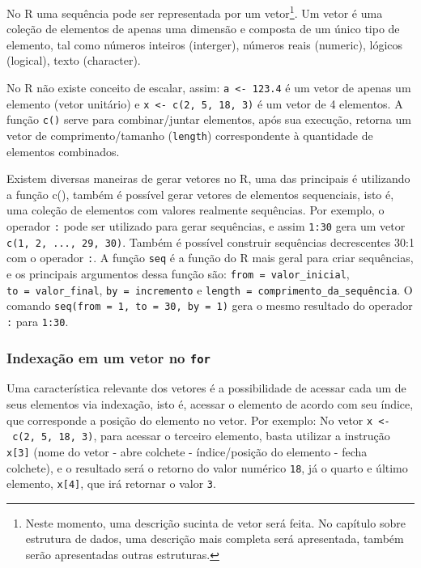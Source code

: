 \documentclass[
  11pt,
  a5paper,
  openany]{book}
\begin{document}
No R uma sequência pode ser representada por um vetor\footnote{Neste momento, uma descrição sucinta de vetor será feita. No capítulo sobre estrutura de dados, uma descrição mais completa será apresentada, também serão apresentadas outras estruturas.}. Um vetor é uma coleção de elementos de apenas uma dimensão e composta de um único tipo de elemento, tal como números inteiros (interger), números reais (numeric), lógicos (logical), texto (character).

No R não existe conceito de escalar, assim: \texttt{a\ \textless{}-\ 123.4} é um vetor de apenas um elemento (vetor unitário) e \texttt{x\ \textless{}-\ c(2,\ 5,\ 18,\ 3)} é um vetor de 4 elementos. A função \texttt{c()} serve para combinar/juntar elementos, após sua execução, retorna um vetor de comprimento/tamanho (\texttt{length}) correspondente à quantidade de elementos combinados.

Existem diversas maneiras de gerar vetores no R, uma das principais é utilizando a função c(), também é possível gerar vetores de elementos sequenciais, isto é, uma coleção de elementos com valores realmente sequências. Por exemplo, o operador \texttt{:} pode ser utilizado para gerar sequências, e assim \texttt{1:30} gera um vetor \texttt{c(1,\ 2,\ ...,\ 29,\ 30)}. Também é possível construir sequências decrescentes 30:1 com o operador \texttt{:}. A função \texttt{seq} é a função do R mais geral para criar sequências, e os principais argumentos dessa função são: \texttt{from\ =\ valor\_inicial}, \texttt{to\ =\ valor\_final}, \texttt{by\ =\ incremento} e \texttt{length\ =\ comprimento\_da\_sequência}. O comando \texttt{seq(from\ =\ 1,\ to\ =\ 30,\ by\ =\ 1)} gera o mesmo resultado do operador \texttt{:} para \texttt{1:30}.

\hypertarget{indexauxe7uxe3o-em-um-vetor-no-for}{%
\subsubsection*{\texorpdfstring{Indexação em um vetor no \texttt{for}}{Indexação em um vetor no for}}\label{indexauxe7uxe3o-em-um-vetor-no-for}}

Uma característica relevante dos vetores é a possibilidade de acessar cada um de seus elementos via indexação, isto é, acessar o elemento de acordo com seu índice, que corresponde a posição do elemento no vetor. Por exemplo: No vetor \texttt{x\ \textless{}-\ c(2,\ 5,\ 18,\ 3)}, para acessar o terceiro elemento, basta utilizar a instrução \texttt{x{[}3{]}} (nome do vetor - abre colchete - índice/posição do elemento - fecha colchete), e o resultado será o retorno do valor numérico \texttt{18}, já o quarto e último elemento, \texttt{x{[}4{]}}, que irá retornar o valor \texttt{3}.
\end{document}
